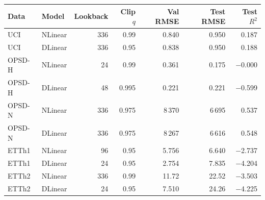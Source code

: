 \begin{tabular}{llrrrrr}
\toprule
Data & Model & Lookback & Clip $q$ & Val RMSE & Test RMSE & Test $R^2$ \\
\midrule
UCI & NLinear & 336 & 0.99 & 0.840 & 0.950 & 0.187 \\
UCI & DLinear & 336 & 0.95 & 0.838 & 0.950 & 0.188 \\
OPSD-H & NLinear & 24 & 0.99 & 0.361 & 0.175 & $-$0.000 \\
OPSD-H & DLinear & 48 & 0.995 & 0.221 & 0.221 & $-$0.599 \\
OPSD-N & NLinear & 336 & 0.975 & 8\,370 & 6\,695 & 0.537 \\
OPSD-N & DLinear & 336 & 0.975 & 8\,267 & 6\,616 & 0.548 \\
ETTh1 & NLinear & 96 & 0.95 & 5.756 & 6.640 & $-$2.737 \\
ETTh1 & DLinear & 24 & 0.95 & 2.754 & 7.835 & $-$4.204 \\
ETTh2 & NLinear & 336 & 0.99 & 11.72 & 22.52 & $-$3.503 \\
ETTh2 & DLinear & 24 & 0.95 & 7.510 & 24.26 & $-$4.225 \\
\bottomrule
\end{tabular}
